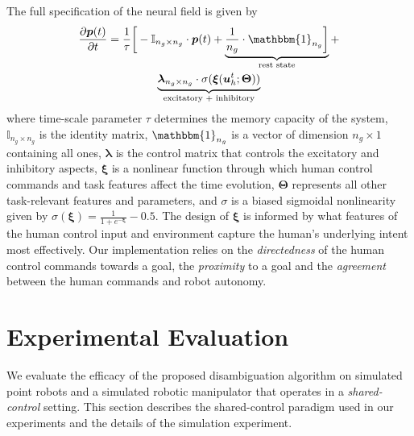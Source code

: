 \documentclass[conference]{IEEEtran}
\begin{document}
The full specification of the neural field is given by
\begin{multline}\label{eq:dft}
\frac{\partial \boldsymbol{p}(t)}{\partial t} = \frac{1}{\tau}\bigg[-\mathbb{I}_{n_g\times n_g}\cdot\boldsymbol{p}(t) + \underbrace{\frac{1}{n_g}\cdot\mathbbm{1}_{n_g}\bigg]}_{\text{rest state}} + \\ \underbrace{\boldsymbol{\lambda}_{n_g\times n_g}\cdot\sigma(\boldsymbol{\xi}(\boldsymbol{u}_h^t;\boldsymbol{\Theta}))}_{\text{excitatory + inhibitory}}
\end{multline}
where time-scale parameter $\tau$ determines the memory capacity of the system, $\mathbb{I}_{n_g\times n_g}$ is the identity matrix, $\mathbbm{1}_{n_g}$ is a vector of dimension $n_g \times 1$ containing all ones, $\boldsymbol{\lambda}$ is the control matrix that controls the excitatory and inhibitory aspects, $\boldsymbol{\xi}$ is a nonlinear function through which human control commands and task features affect the time evolution, $\boldsymbol{\Theta}$ represents all other task-relevant features and parameters, and $\sigma$ is a biased sigmoidal nonlinearity given by $\sigma(\boldsymbol{\xi}) = \frac{1}{1 + e^{-\boldsymbol{\xi}}} - 0.5$. 
The design of $\boldsymbol{\xi}$ is informed by what features of the human control input and environment capture the human's underlying intent most effectively. Our implementation relies on the \textit{directedness} of the human control commands towards a goal, the \textit{proximity} to a goal and the \textit{agreement} between the human commands and robot autonomy.

\section{Experimental Evaluation}\label{sec:ed}
We evaluate the efficacy of the proposed disambiguation algorithm on simulated point robots and a simulated robotic manipulator that operates in a \textit{shared-control} setting. This section describes the shared-control paradigm used in our experiments and the details of the simulation experiment. 
\end{document}
